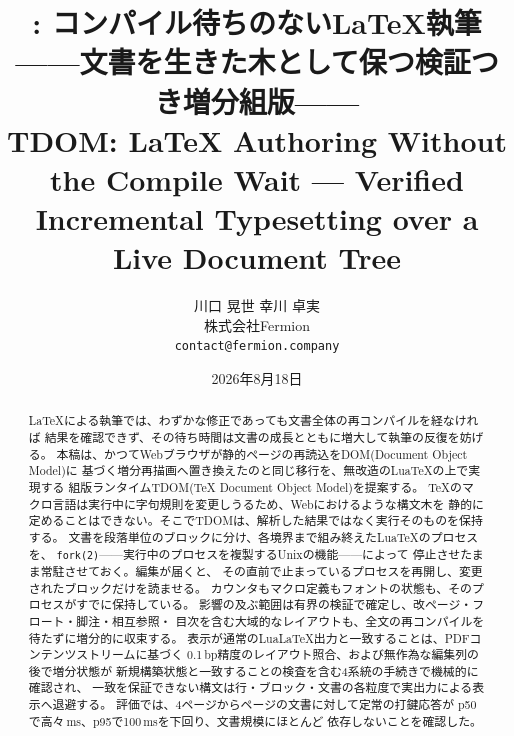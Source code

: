 \documentclass[a4paper,11pt]{ltjsarticle}
\title{\tdom{}: コンパイル待ちのないLaTeX執筆\\
——文書を生きた木として保つ検証つき増分組版——\\[1.5mm]
{\normalsize\mdseries TDOM: LaTeX Authoring Without the Compile Wait ---
Verified Incremental Typesetting over a Live Document Tree}}
\author{川口 晃世 \quad 幸川 卓実\\[1mm]
{\normalsize 株式会社Fermion}\\
{\normalsize \texttt{contact@fermion.company}}}
\date{2026年8月18日}
\newcommand{\tdom}{TDOM}
\newcommand{\code}[1]{\texttt{#1}}
\begin{document}
\maketitle

\begin{abstract}
\LaTeX{}による執筆では、わずかな修正であっても文書全体の再コンパイルを経なければ
結果を確認できず、その待ち時間は文書の成長とともに増大して執筆の反復を妨げる。
本稿は、かつてWebブラウザが静的ページの再読込をDOM(Document Object Model)に
基づく増分再描画へ置き換えたのと同じ移行を、無改造のLuaTeXの上で実現する
組版ランタイム\tdom{}(TeX Document Object Model)を提案する。
\TeX{}のマクロ言語は実行中に字句規則を変更しうるため、Webにおけるような構文木を
静的に定めることはできない。そこで\tdom{}は、解析した結果ではなく実行そのものを保持する。
文書を段落単位のブロックに分け、各境界まで組み終えたLuaTeXのプロセスを、
\code{fork(2)}——実行中のプロセスを複製するUnixの機能——によって
停止させたまま常駐させておく。編集が届くと、
その直前で止まっているプロセスを再開し、変更されたブロックだけを読ませる。
カウンタもマクロ定義もフォントの状態も、そのプロセスがすでに保持している。
影響の及ぶ範囲は有界の検証で確定し、改ページ・フロート・脚注・相互参照・
目次を含む大域的なレイアウトも、全文の再コンパイルを待たずに増分的に収束する。
表示が通常のLuaLaTeX出力と一致することは、PDFコンテンツストリームに基づく
0.1\,bp精度のレイアウト照合、および無作為な編集列の後で増分状態が
新規構築状態と一致することの検査を含む4系統の手続きで機械的に確認され、
一致を保証できない構文は行・ブロック・文書の各粒度で実出力による表示へ退避する。
評価では、4ページから\nLpages ページの文書に対して定常の打鍵応答が
p50で高々\nWorstP\,ms、p95で100\,msを下回り、文書規模にほとんど
依存しないことを確認した。
\end{abstract}
\end{document}
